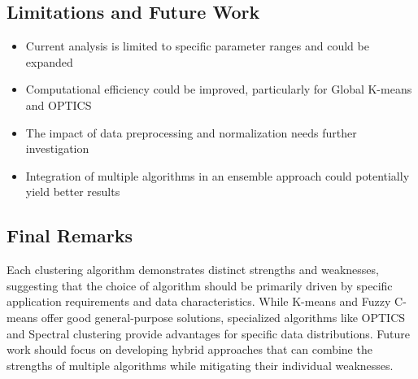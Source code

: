 \subsection{Limitations and Future Work}

\begin{itemize}
    \item Current analysis is limited to specific parameter ranges and could be expanded
    \item Computational efficiency could be improved, particularly for Global K-means and OPTICS
    \item The impact of data preprocessing and normalization needs further investigation
    \item Integration of multiple algorithms in an ensemble approach could potentially yield better results
\end{itemize}

\subsection{Final Remarks}

Each clustering algorithm demonstrates distinct strengths and weaknesses, suggesting that the choice of algorithm should be primarily driven by specific application requirements and data characteristics. While K-means and Fuzzy C-means offer good general-purpose solutions, specialized algorithms like OPTICS and Spectral clustering provide advantages for specific data distributions. Future work should focus on developing hybrid approaches that can combine the strengths of multiple algorithms while mitigating their individual weaknesses.

